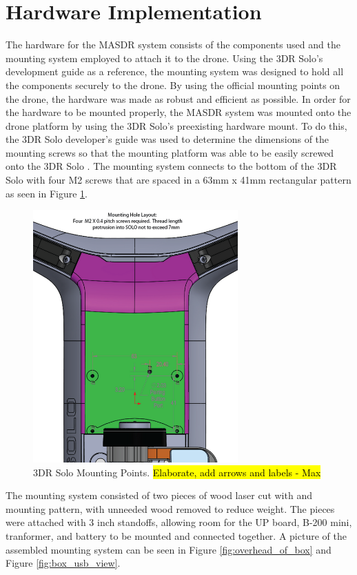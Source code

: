 \section{Hardware Implementation}\label{Mounting}
The hardware for the MASDR system consists of the components used and the mounting system employed to attach it to the drone. Using the 3DR Solo’s development guide as a reference, the mounting system was designed to hold all the components securely to the drone. By using the official mounting points on the drone, the hardware was made as robust and efficient as possible.
In order for the hardware to be mounted properly, the MASDR system was mounted onto the drone platform by using the 3DR Solo’s preexisting hardware mount. To do this, the 3DR Solo developer's guide was used to determine the dimensions of the mounting screws so that the mounting platform was able to be easily screwed onto the 3DR Solo \cite{3dr_devguide}. The mounting system connects to the bottom of the 3DR Solo with four M2 screws that are spaced in a 63mm x 41mm rectangular pattern as seen in Figure \ref{fig:solo_mount}.
\begin{figure}[ht]
\centering
\includegraphics[width=0.70\textwidth]{img/solo_mount_points.png}
\caption{3DR Solo Mounting Points. \hl{Elaborate, add arrows and labels - Max}}
\label{fig:solo_mount}
\end{figure} \par
The mounting system consisted of two pieces of wood laser cut with and mounting pattern, with unneeded wood removed to reduce weight. The pieces were attached with 3 inch standoffs, allowing room for the UP board, B-200 mini, tranformer, and battery to be mounted and connected together. A picture of the assembled mounting system can be seen in Figure \ref{fig:overhead_of_box} and Figure \ref{fig:box_usb_view}. \par

